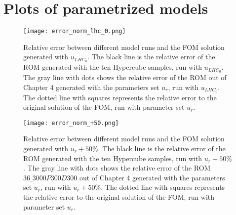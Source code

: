 \section{Plots of parametrized models}

\begin{figure}[H]
\centering
  \texttt{[image: error\_norm\_lhc\_0.png]}
  \captionsetup{width=1\textwidth}
  \caption[Relative error between different model runs and the FOM solution generated with $u_{LHC_0}$.]{Relative error between different model runs and the FOM solution generated with $u_{LHC_0}$. The black line is the relative error of the ROM generated with the
  ten Hypercube samples, run with $u_{LHC_0}$. The gray line with dots shows the relative error of the ROM out of Chapter 4 generated with the parameters set $u_r$, run with $u_{LHC_0}$.
  The dotted line with squares represents the relative error to the original solution of the FOM, run with parameter set $u_r$.}
  \label{fig:error_norm_lhc_0}
\end{figure}

\begin{figure}[H]
\centering
  \texttt{[image: error\_norm\_+50.png]}
  \captionsetup{width=1\textwidth}
  \caption[Relative error between different model runs and the FOM solution generated with $u_r + 50\%$.]{Relative error between different model runs and the FOM solution generated with $u_r + 50\%$. The black line is the relative error of the ROM generated with the
  ten Hypercube samples, run with $u_r + 50\%$. The gray line with dots shows the relative error of the ROM $36\_3000P300D300$ out of Chapter 4 generated with the parameters set $u_r$, run with  $u_r + 50\%$.
  The dotted line with squares represents the relative error to the original solution of the FOM, run with parameter set $u_r$.}
  \label{fig:error_norm_+50}
\end{figure}

